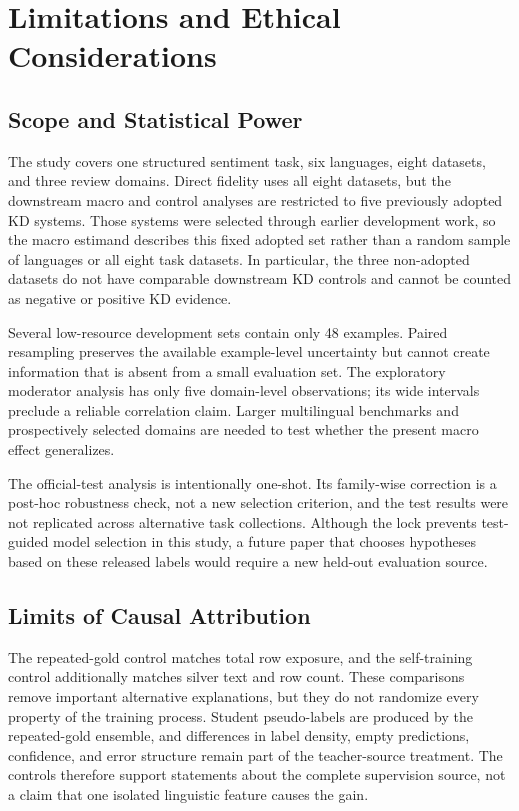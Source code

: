 \section{Limitations and Ethical
Considerations}\label{limitations-and-ethical-considerations}

\subsection{Scope and Statistical
Power}\label{scope-and-statistical-power}

The study covers one structured sentiment task, six languages, eight
datasets, and three review domains. Direct fidelity uses all eight
datasets, but the downstream macro and control analyses are restricted
to five previously adopted KD systems. Those systems were selected
through earlier development work, so the macro estimand describes this
fixed adopted set rather than a random sample of languages or all eight
task datasets. In particular, the three non-adopted datasets do not have
comparable downstream KD controls and cannot be counted as negative or
positive KD evidence.

Several low-resource development sets contain only 48 examples. Paired
resampling preserves the available example-level uncertainty but cannot
create information that is absent from a small evaluation set. The
exploratory moderator analysis has only five domain-level observations;
its wide intervals preclude a reliable correlation claim. Larger
multilingual benchmarks and prospectively selected domains are needed to
test whether the present macro effect generalizes.

The official-test analysis is intentionally one-shot. Its family-wise
correction is a post-hoc robustness check, not a new selection
criterion, and the test results were not replicated across alternative
task collections. Although the lock prevents test-guided model selection
in this study, a future paper that chooses hypotheses based on these
released labels would require a new held-out evaluation source.

\subsection{Limits of Causal
Attribution}\label{limits-of-causal-attribution}

The repeated-gold control matches total row exposure, and the
self-training control additionally matches silver text and row count.
These comparisons remove important alternative explanations, but they do
not randomize every property of the training process. Student
pseudo-labels are produced by the repeated-gold ensemble, and
differences in label density, empty predictions, confidence, and error
structure remain part of the teacher-source treatment. The controls
therefore support statements about the complete supervision source, not
a claim that one isolated linguistic feature causes the gain.

